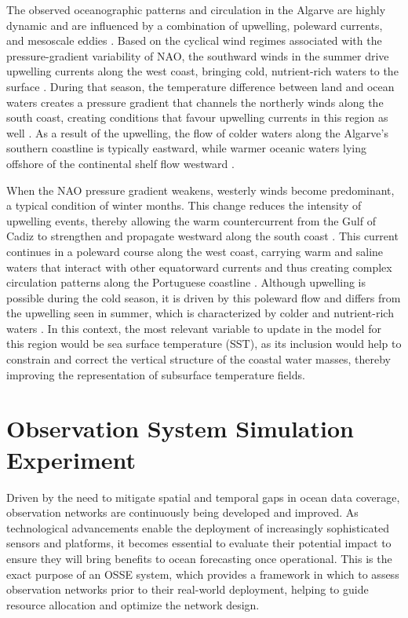 The observed oceanographic patterns and circulation in the Algarve are highly dynamic and are influenced by a combination of upwelling, poleward currents, and mesoscale eddies \parencite{relvas2002mesoscale}. Based on the cyclical wind regimes associated with the pressure-gradient variability of NAO, the southward winds in the summer drive upwelling currents along the west coast, bringing cold, nutrient-rich waters to the surface \parencite{relvas2007physical}. During that season, the temperature difference between land and ocean waters creates a pressure gradient that channels the northerly winds along the south coast, creating conditions that favour upwelling currents in this region as well \parencite{leitao2018northerly}. As a result of the upwelling, the flow of colder waters along the Algarve's southern coastline is typically eastward, while warmer oceanic waters lying offshore of the continental shelf flow westward \parencite{fiuza1983upwelling}.

When the NAO pressure gradient weakens, westerly winds become predominant, a typical condition of winter months. This change reduces the intensity of upwelling events, thereby allowing the warm countercurrent from the Gulf of Cadiz to strengthen and propagate westward along the south coast \parencite{telesmachado2007onset, garel2016characterisation}. This current continues in a poleward course along the west coast, carrying warm and saline waters that interact with other equatorward currents and thus creating complex circulation patterns along the Portuguese coastline \parencite{haynes1990poleward, frouin1990observations}. Although upwelling is possible during the cold season, it is driven by this poleward flow and differs from the upwelling seen in summer, which is characterized by colder and nutrient-rich waters \parencite{relvas2005separated}. In this context, the most relevant variable to update in the model for this region would be sea surface temperature (SST), as its inclusion would help to constrain and correct the vertical structure of the coastal water masses, thereby improving the representation of subsurface temperature fields.

\section{Observation System Simulation Experiment} \label{sec:ossedesign_osse}
Driven by the need to mitigate spatial and temporal gaps in ocean data coverage, observation networks are continuously being developed and improved. As technological advancements enable the deployment of increasingly sophisticated sensors and platforms, it becomes essential to evaluate their potential impact to ensure they will bring benefits to ocean forecasting once operational. This is the exact purpose of an OSSE system, which provides a framework in which to assess observation networks prior to their real-world deployment, helping to guide resource allocation and optimize the network design.

